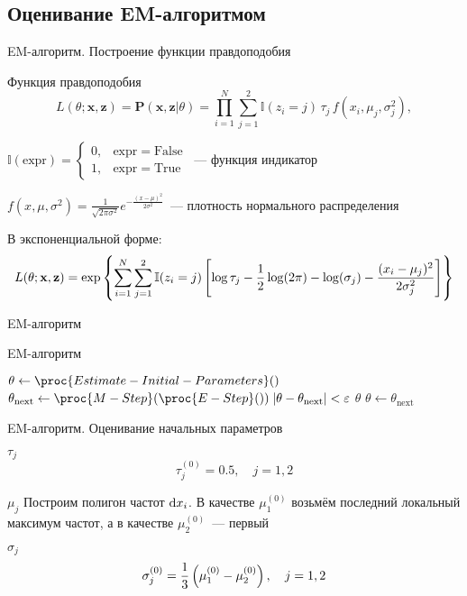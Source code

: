 \documentclass[utf8,handout]{beamer}
\begin{document}
\subsection[EM-алгоритм]{Оценивание EM-алгоритмом}
\begin{frame}{EM-алгоритм. Построение функции правдоподобия}
\begin{block}{Функция правдоподобия}
  $$
  L(\theta; \mathbf{x}, \mathbf{z}) = 
    \mathbf{P}(\mathbf{x}, \mathbf{z} \vert \theta) = 
    \prod\limits_{i=1}^{N} \sum\limits_{j=1}^2 
      \mathbb{I}(z_i=j) \, \tau_j \, f(x_i,\mu_j,\sigma_j^2),
  $$

{\footnotesize
$\mathbb{I}(\mathrm{expr}) = \left\{
  \begin{array}{rl}
    0, & \mathrm{expr} = \mathrm{False} \\
    1, & \mathrm{expr} = \mathrm{True}
  \end{array}\right.$~--- функция индикатор

$f(x, \mu, \sigma^2) = 
    \frac{1}{\sqrt{2 \pi \sigma^2}} e^{-\frac{(x - \mu)^2}{2 \sigma^2}}$~---
плотность нормального распределения
}
\end{block}

В экспоненциальной форме:
{\small
$$
L(\theta; \mathbf{x}, \mathbf{z}) =
  \exp \cbr{ \sum\limits_{i=1}^{N} \sum\limits_{j=1}^2 
    \mathbb{I}(z_i=j) \sbr{
      \log \tau_j - 
      \frac{1}{2}\log(2\pi) -
      \log(\sigma_j) -
      \frac{(x_i - \mu_j)^2}{2 \sigma_j^2}}}
$$}
\end{frame}


\begin{frame}{EM-алгоритм}
\begin{block}{EM-алгоритм}
\begin{codebox}
\li $\theta \gets \proc{Estimate-Initial-Parameters}()$
\li \While {}
\li \Do
      $\theta_{\mathrm{next}} \gets \proc{M-Step}(\proc{E-Step}())$
\li   \If $\envert{\theta - \theta_{\mathrm{next}}} < \varepsilon$
\li   \Then
        \Return $\theta$
\li   \Else
        $\theta \gets \theta_{\mathrm{next}}$
      \End
    \End
\end{codebox}
\end{block}
\end{frame}


\begin{frame}{EM-алгоритм. Оценивание начальных параметров}
\begin{block}{$\tau_j$}
$$
\tau_j^{(0)} = 0.5, \quad j=1,2
$$
\end{block}
\begin{block}{$\mu_j$}
Построим полигон частот $\dif x_i$.
В качестве $\mu_1^{(0)}$ возьмём последний локальный максимум частот,
а в качестве $\mu_2^{(0)}$~--- первый
\end{block}
\begin{block}{$\sigma_j$}
$$\sigma_j^{(0)} = \frac{1}{3}\del{\mu_1^{(0)} - \mu_2^{(0)}}, \quad j=1, 2$$
\end{block}
\end{frame}
\end{document}
